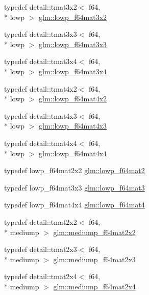 \begin{DoxyCompactItemize}
typedef detail\-::tmat3x2$<$ f64, \\*
lowp $>$ \hyperlink{group__gtc__type__precision_ga99f6455a37a4c407a26981561184c76d}{glm\-::lowp\-\_\-f64mat3x2}
\item 
typedef detail\-::tmat3x3$<$ f64, \\*
lowp $>$ \hyperlink{group__gtc__type__precision_ga3b636bef3048da2f7935eae13e66f7b3}{glm\-::lowp\-\_\-f64mat3x3}
\item 
typedef detail\-::tmat3x4$<$ f64, \\*
lowp $>$ \hyperlink{group__gtc__type__precision_ga988c6645dead17a842c47ec042b5369e}{glm\-::lowp\-\_\-f64mat3x4}
\item 
typedef detail\-::tmat4x2$<$ f64, \\*
lowp $>$ \hyperlink{group__gtc__type__precision_ga37d10de43251a9a1be734bbb340ad2e7}{glm\-::lowp\-\_\-f64mat4x2}
\item 
typedef detail\-::tmat4x3$<$ f64, \\*
lowp $>$ \hyperlink{group__gtc__type__precision_ga05dba0f9d45301c7b10a9276c60b8a0e}{glm\-::lowp\-\_\-f64mat4x3}
\item 
typedef detail\-::tmat4x4$<$ f64, \\*
lowp $>$ \hyperlink{group__gtc__type__precision_gab7d0922ed8d93ee3ce995858feb41231}{glm\-::lowp\-\_\-f64mat4x4}
\item 
typedef lowp\-\_\-f64mat2x2 \hyperlink{group__gtc__type__precision_ga2984b3b0b6ee0657044d186bb875b4e3}{glm\-::lowp\-\_\-f64mat2}
\item 
typedef lowp\-\_\-f64mat3x3 \hyperlink{group__gtc__type__precision_ga4acbda53fb7ff9568c0a2786fad450b8}{glm\-::lowp\-\_\-f64mat3}
\item 
typedef lowp\-\_\-f64mat4x4 \hyperlink{group__gtc__type__precision_ga4378d9384f1b24848043ccb02dcf2959}{glm\-::lowp\-\_\-f64mat4}
\item 
typedef detail\-::tmat2x2$<$ f64, \\*
mediump $>$ \hyperlink{group__gtc__type__precision_gacfa9f872c78d9e8b8e6c5dd0088db8fc}{glm\-::mediump\-\_\-f64mat2x2}
\item 
typedef detail\-::tmat2x3$<$ f64, \\*
mediump $>$ \hyperlink{group__gtc__type__precision_ga6f463cb5e9b4e5c07a385843ed50e6b8}{glm\-::mediump\-\_\-f64mat2x3}
\item 
typedef detail\-::tmat2x4$<$ f64, \\*
mediump $>$ \hyperlink{group__gtc__type__precision_ga65c67789f7e2ff605d8f48dc3750a515}{glm\-::mediump\-\_\-f64mat2x4}

\end{DoxyCompactItemize}

